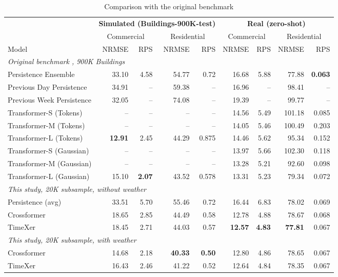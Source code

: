 \documentclass[11pt]{article}
\begin{document}
\begin{table}[H]
\centering
\small
\setlength{\tabcolsep}{4pt}
\begin{tabular}{l rr rr rr rr}
\toprule
& \multicolumn{4}{c}{\textbf{Simulated (Buildings-900K-test)}} & \multicolumn{4}{c}{\textbf{Real (zero-shot)}} \\
\cmidrule(lr){2-5}\cmidrule(lr){6-9}
& \multicolumn{2}{c}{Commercial} & \multicolumn{2}{c}{Residential} & \multicolumn{2}{c}{Commercial} & \multicolumn{2}{c}{Residential} \\
\cmidrule(lr){2-3}\cmidrule(lr){4-5}\cmidrule(lr){6-7}\cmidrule(lr){8-9}
Model & NRMSE & RPS & NRMSE & RPS & NRMSE & RPS & NRMSE & RPS \\
\midrule
\multicolumn{9}{l}{\emph{Original benchmark \citep{buildingsbench2023}, 900K Buildings}} \\
Persistence Ensemble      & 33.10 & 4.58 & 54.77 & 0.72  & 16.68 & 5.88 & 77.88 & \textbf{0.063} \\
Previous Day Persistence  & 34.91 & --   & 59.38 & --    & 16.96 & --   & 98.41 & --    \\
Previous Week Persistence & 32.05 & --   & 74.08 & --    & 19.39 & --   & 99.77 & --    \\
Transformer-S (Tokens)    & --    & --   & --    & --    & 14.56 & 5.49 & 101.18 & 0.085 \\
Transformer-M (Tokens)    & --    & --   & --    & --    & 14.05 & 5.46 & 100.49 & 0.203 \\
Transformer-L (Tokens)    & \textbf{12.91} & 2.45 & 44.29 & 0.875 & 14.46 & 5.62 & 95.34  & 0.152 \\
Transformer-S (Gaussian)  & --    & --   & --    & --    & 13.97 & 5.66 & 102.30 & 0.118 \\
Transformer-M (Gaussian)  & --    & --   & --    & --    & 13.28 & 5.21 & 92.60  & 0.098 \\
Transformer-L (Gaussian)  & 15.10 & \textbf{2.07} & 43.52 & 0.578 & 13.31 & 5.23 & 79.34  & 0.072 \\
\midrule
\multicolumn{9}{l}{\emph{This study, 20K subsample, without weather}} \\
Persistence (avg)         & 33.51 & 5.70 & 55.46 & 0.72  & 16.44 & 6.83 & 78.02 & 0.069 \\
Crossformer               & 18.65 & 2.85 & 44.49 & 0.58  & 12.78 & 4.88 & 78.67 & 0.068 \\
TimeXer                   & 18.45 & 2.71 & 44.03 & 0.57  & \textbf{12.57} & \textbf{4.83} & \textbf{77.81} & 0.067 \\
\midrule
\multicolumn{9}{l}{\emph{This study, 20K subsample, with weather}} \\
Crossformer               & 14.68 & 2.18 & \textbf{40.33} & \textbf{0.50}  & 12.80 & 4.86 & 78.65 & 0.067 \\
TimeXer                   & 16.43 & 2.46 & 41.22 & 0.52  & 12.64 & 4.84 & 78.35 & 0.067 \\
\bottomrule
\end{tabular}
\caption{Comparison with the original benchmark}
\label{tab:vs-paper}
\end{table}
\end{document}
